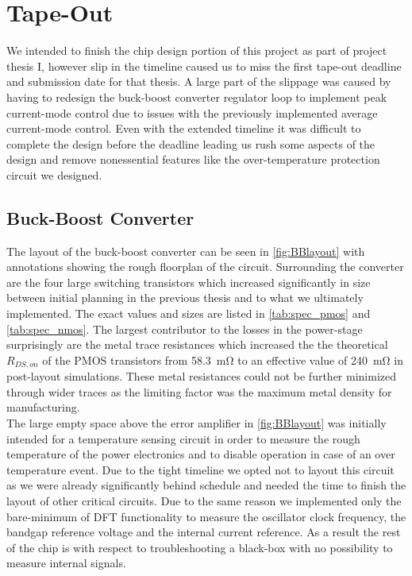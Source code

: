 \section{Tape-Out}
\label{sec:tapout}

We intended to finish the chip design portion of this project as part of project thesis I, however slip in the timeline caused us to miss the first tape-out deadline and submission date for that thesis. A large part of the slippage was caused by having to redesign the buck-boost converter regulator loop to implement peak current-mode control due to issues with the previously implemented average current-mode control. Even with the extended timeline it was difficult to complete the design before the deadline leading us rush some aspects of the design and remove nonessential features like the over-temperature protection circuit we designed.

\subsection{Buck-Boost Converter}
The layout of the buck-boost converter can be seen in  \autoref{fig:BBlayout} with annotations showing the rough floorplan of the circuit. Surrounding the converter are the four large switching transistors which increased significantly in size between initial planning in the previous thesis and to what we ultimately implemented. The exact values and sizes are listed in \autoref{tab:spec_pmos} and \autoref{tab:spec_nmos}. The largest contributor to the losses in the power-stage surprisingly are the metal trace resistances which increased the the theoretical $R_{DS,on}$ of the \ac{PMOS} transistors from \qty{58.3}{\milli\ohm} to an effective value of \qty{240}{\milli\ohm} in post-layout simulations. These metal resistances could not be further minimized through wider traces as the limiting factor was the maximum metal density for manufacturing. \\
The large empty space above the error amplifier in \autoref{fig:BBlayout} was initially intended for a temperature sensing circuit in order to measure the rough temperature of the power electronics and to disable operation in case of an over temperature event. Due to the tight timeline we opted not to layout this circuit as we were already significantly behind schedule and needed the time to finish the layout of other critical circuits. Due to the same reason we implemented only the bare-minimum of \ac{DFT} functionality to measure the oscillator clock frequency, the bandgap reference voltage and the internal current reference. As a result the rest of the chip is with respect to troubleshooting a black-box with no possibility to measure internal signals.

